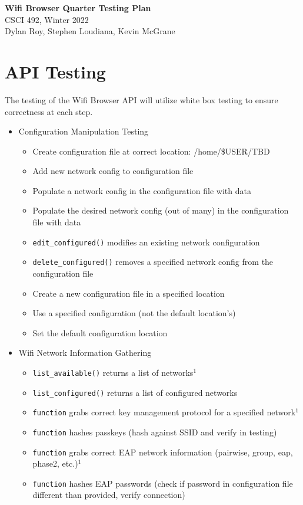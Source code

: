 \documentclass[11pt]{article}
\begin{document}
\begin{center}
  \textbf{\Large Wifi Browser Quarter Testing Plan}\\\large CSCI 492, Winter 2022\\
  Dylan Roy, Stephen Loudiana, Kevin McGrane
\end{center}

\section{API Testing}
The testing of the Wifi Browser API will utilize white box testing to ensure correctness at each step.
\begin{itemize}
  \item Configuration Manipulation Testing
  \begin{itemize}
    \item Create configuration file at correct location: /home/\$USER/TBD
    \item Add new network config to configuration file
    \item Populate a network config in the configuration file with data
    \item Populate the desired network config (out of many) in the configuration file with data
    \item \texttt{edit\_configured()} modifies an existing network configuration
    \item \texttt{delete\_configured()} removes a specified network config from the configuration file
    \item Create a new configuration file in a specified location
    \item Use a specified configuration (not the default location's)
    \item Set the default configuration location
  \end{itemize}

  \item Wifi Network Information Gathering
  \begin{itemize}
    \item \texttt{list\_available()} returns a list of networks$^1$ 
    \item \texttt{list\_configured()} returns a list of configured networks
    \item \texttt{function} grabs correct key management protocol for a specified network$^1$
    \item \texttt{function} hashes passkeys (hash against SSID and verify in testing)
    \item \texttt{function} grabs correct EAP network information (pairwise, group, eap, phase2, etc.)$^1$
    \item \texttt{function} hashes EAP passwords (check if password in configuration file different than provided, verify connection)
  \end{itemize}


\end{itemize}
\end{document}
